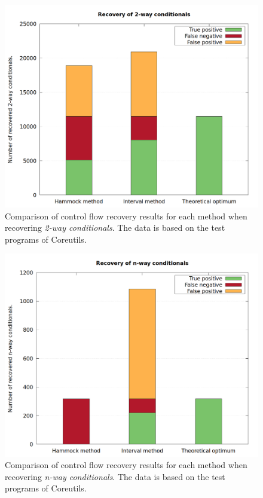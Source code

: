 \begin{figure}[htbp]
	\centering
	\includegraphics[width=\textwidth]{inc/appendices/test_program_results/coreutils/results_2-way.png}
	\caption{Comparison of control flow recovery results for each method when recovering \textit{2-way conditionals}. The data is based on the test programs of Coreutils.}
	\label{fig:coreutils_results_2way}
\end{figure}

\begin{figure}[htbp]
	\centering
	\includegraphics[width=\textwidth]{inc/appendices/test_program_results/coreutils/results_n-way.png}
	\caption{Comparison of control flow recovery results for each method when recovering \textit{n-way conditionals}. The data is based on the test programs of Coreutils.}
	\label{fig:coreutils_results_nway}
\end{figure}

